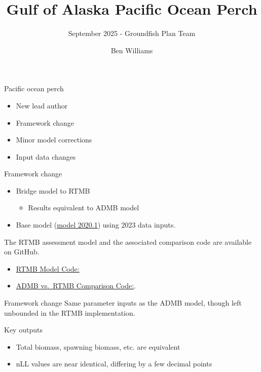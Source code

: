 \documentclass[
  ignorenonframetext,
]{beamer}
\title{Gulf of Alaska Pacific Ocean Perch}
\subtitle{September 2025 - Groundfish Plan Team}
\author{Ben Williams}
\date{}
\providecommand{\tightlist}{%
  \setlength{\itemsep}{0pt}\setlength{\parskip}{0pt}}\usepackage{longtable,booktabs,array}
\begin{document}
\frame{\titlepage}
\ifdefined\Shaded\renewenvironment{Shaded}{\begin{tcolorbox}[borderline west={3pt}{0pt}{shadecolor}, boxrule=0pt, interior hidden, sharp corners, enhanced, frame hidden, breakable]}{\end{tcolorbox}}\fi

\begin{frame}{Pacific ocean perch}
\protect\hypertarget{pacific-ocean-perch}{}
\begin{itemize}[<+->]
\tightlist
\item
  New lead author
\item
  Framework change
\item
  Minor model corrections
\item
  Input data changes
\end{itemize}
\end{frame}

\begin{frame}{Framework change}
\protect\hypertarget{framework-change}{}
\begin{itemize}[<+->]
\tightlist
\item
  Bridge model to RTMB

  \begin{itemize}[<+->]
  \tightlist
  \item
    Results equivalent to ADMB model
  \end{itemize}
\item
  Base model
  (\href{https://github.com/pete-hulson/goa_pop/tree/main/2025/base}{model
  2020.1}) using 2023 data inputs.
\end{itemize}

The RTMB assessment model and the associated comparison code are
available on GitHub.

\begin{itemize}[<+->]
\tightlist
\item
  \href{https://github.com/pete-hulson/goa_pop/blob/main/2025/R/models.R}{RTMB
  Model Code:}
\item
  \href{https://github.com/pete-hulson/goa_pop/blob/main/2025/R/rtmb_bridge.R}{ADMB
  vs.~RTMB Comparison Code:}.
\end{itemize}
\end{frame}

\begin{frame}{Framework change}
\protect\hypertarget{framework-change-1}{}
Same parameter inputs as the ADMB model, though left unbounded in the
RTMB implementation.

\begin{block}{Key outputs}
\protect\hypertarget{key-outputs}{}
\begin{itemize}[<+->]
\tightlist
\item
  Total biomass, spawning biomass, etc. are equivalent
\item
  nLL values are near identical, differing by a few decimal points
\end{itemize}
\end{block}
\end{frame}
\end{document}

